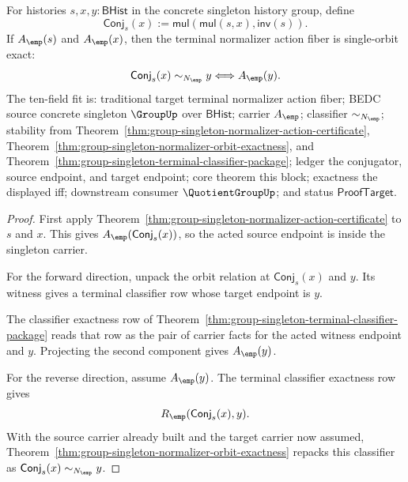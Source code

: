 \begin{theorem}
\label{thm:group-singleton-normalizer-action-single-orbit-fiber}
For histories $s,x,y:\mathsf{BHist}$ in the concrete singleton history group,
define
$$
\mathsf{Conj}_s(x):=\mathsf{mul}(\mathsf{mul}(s,x),\mathsf{inv}(s)).
$$
If $A_{\emp}(s)$ and $A_{\emp}(x)$, then the terminal normalizer action fiber is
single-orbit exact:
$$
\mathsf{Conj}_s(x)\sim_{N_{\emp}} y \Longleftrightarrow A_{\emp}(y).
$$
The ten-field fit is: traditional target terminal normalizer action fiber; BEDC
source concrete singleton $\GroupUp$ over $\mathsf{BHist}$; carrier
$A_{\emp}$; classifier $\sim_{N_{\emp}}$; stability from
Theorem~\ref{thm:group-singleton-normalizer-action-certificate},
Theorem~\ref{thm:group-singleton-normalizer-orbit-exactness}, and
Theorem~\ref{thm:group-singleton-terminal-classifier-package}; ledger the
conjugator, source endpoint, and target endpoint; core theorem this block;
exactness the displayed iff; downstream consumer $\QuotientGroupUp$; and status
$\mathsf{ProofTarget}$.
\end{theorem}
\begin{proof}
First apply
Theorem~\ref{thm:group-singleton-normalizer-action-certificate} to $s$ and
$x$. This gives $A_{\emp}(\mathsf{Conj}_s(x))$, so the acted source endpoint is
inside the singleton carrier.

For the forward direction, unpack the orbit relation at
$\mathsf{Conj}_s(x)$ and $y$. Its witness gives a terminal classifier row whose
target endpoint is $y$.

The classifier exactness row of
Theorem~\ref{thm:group-singleton-terminal-classifier-package} reads that row as
the pair of carrier facts for the acted witness endpoint and $y$. Projecting the
second component gives $A_{\emp}(y)$.

For the reverse direction, assume $A_{\emp}(y)$. The terminal classifier
exactness row gives
$$
R_{\emp}(\mathsf{Conj}_s(x),y).
$$
With the source carrier already built and the target carrier now assumed,
Theorem~\ref{thm:group-singleton-normalizer-orbit-exactness} repacks this
classifier as
$\mathsf{Conj}_s(x)\sim_{N_{\emp}} y$.
\end{proof}

